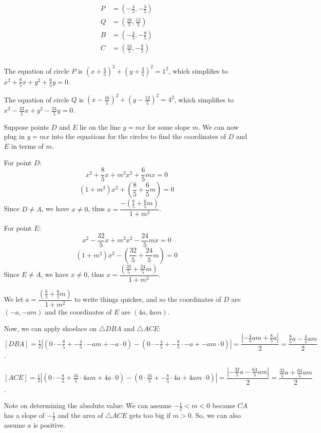 \begin{enumerate}
 \begin{align}P &= \left(-\frac{4}{5},-\frac{3}{5}\right) \\Q &= \left(\frac{16}{5},\frac{12}{5}\right) \\B &= \left(-\frac{4}{5},-\frac{8}{5}\right) \\C &= \left(\frac{16}{5},-\frac{8}{5}\right) \\\end{align}

 The equation of circle $P$ is $\left(x+\frac{4}{5}\right)^2+\left(y+\frac{3}{5}\right)^2 = 1^2$, which simplifies to $x^2+\frac{8}{5}x+y^2+\frac{6}{5}y=0$.

 The equation of circle $Q$ is $\left(x-\frac{16}{5}\right)^2+\left(y-\frac{12}{5}\right)^2 = 4^2$, which simplifies to $x^2-\frac{32}{5}x+y^2-\frac{24}{5}y=0$.

 Suppose points $D$ and $E$ lie on the line $y=mx$ for some slope $m$. We can now plug in $y=mx$ into the equations for the circles to find the coordinates of $D$ and $E$ in terms of $m$.

 For point $D$:
 \[x^2+\frac{8}{5}x+m^2x^2+\frac{6}{5}mx=0\]
 \[(1+m^2)x^2+\left(\frac{8}{5}+\frac{6}{5}m\right)=0\]Since $D \neq A$, we have $x \neq 0$, thus $x=\dfrac{-\left(\frac{8}{5}+\frac{6}{5}m\right)}{1+m^2}$.

 For point $E$:
 \[x^2-\frac{32}{5}x+m^2x^2-\frac{24}{5}mx=0\]
 \[(1+m^2)x^2-\left(\frac{32}{5}+\frac{24}{5}m\right)=0\]Since $E \neq A$, we have $x \neq 0$, thus $x=\dfrac{\left(\frac{32}{5}+\frac{24}{5}m\right)}{1+m^2}$.

 We let $a=\dfrac{\left(\frac{8}{5}+\frac{6}{5}m\right)}{1+m^2}$ to write things quicker, and so the coordinates of $D$ are $(-a,-am)$ and the coordinates of $E$ are $(4a,4am)$. 

 Now, we can apply shoelace on $\triangle DBA$ and $\triangle ACE$:$[DBA] = \frac {1}{2}\left|(0 \cdot -\frac{8}{5} + -\frac{4}{5} \cdot -am + -a \cdot 0) - (0 \cdot -\frac{4}{5} + -\frac{8}{5} \cdot -a + -am \cdot 0)\right| = \dfrac{\left|-\frac{4}{5}am + \frac{8}{5}a\right|}{2} = \dfrac{\frac{8}{5}a-\frac{4}{5}am}{2}$.

 $[ACE] = \frac {1}{2}\left|(0 \cdot -\frac{8}{5} + \frac{16}{5} \cdot 4am + 4a \cdot 0) - (0 \cdot \frac{16}{5} + -\frac{8}{5} \cdot 4a + 4am \cdot 0)\right| = \dfrac{\left|-\frac{32}{5}a-\frac{64}{5}am\right|}{2} = \dfrac{\frac{32}{5}a+\frac{64}{5}am}{2}$. 

 Note on determining the absolute value: We can assume $-\frac{1}{2}<m<0$ because $\overline{CA}$ has a slope of $-\frac{1}{2}$ and the area of $\triangle ACE$ gets too big if $m>0$. So, we can also assume $a$ is positive.


\end{enumerate}
